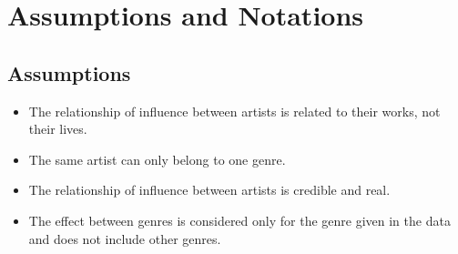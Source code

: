 \documentclass[12pt]{article}  %
\begin{document}





\section{Assumptions and Notations}
\subsection{Assumptions}
\begin{itemize}
	\setlength{\parsep}{0ex} %
	\setlength{\topsep}{2ex} %
	\setlength{\itemsep}{1ex} %
	\item The relationship of influence between artists is related to their works, not their lives.
	\item The same artist can only belong to one genre. 
	\item The relationship of influence between artists is credible and real. 
	\item The effect between genres is considered only for the genre given in the data and does not include other genres.  
\end{itemize}
\end{document}

